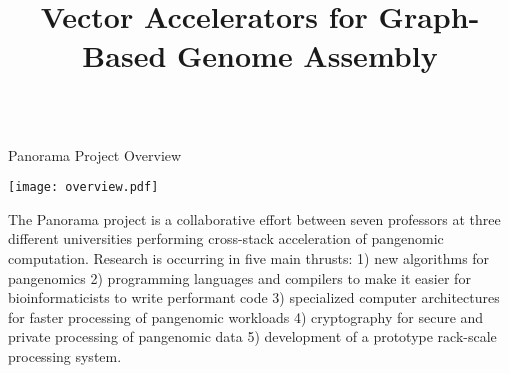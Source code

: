 \documentclass{cbxposter}
\title
{%
  Vector Accelerators for Graph-Based Genome Assembly
}
\renewcommand{\smallskip}{\vspace{0.16667in}}
\begin{document}
\begin{frame}[fragile,t]{}
\vspace{0.1in}
\begin{columns}[T]


\begin{column}{10.5in}
\vspace{0.4in}


\begin{block}{Panorama Project Overview}
  \begin{center}
    \texttt{[image: overview.pdf]}
  \end{center}

  \smallskip

  The Panorama project is a collaborative effort between seven professors
  at three different universities performing cross-stack acceleration of
  pangenomic computation. Research is occurring in five main thrusts: 1)
  new algorithms for pangenomics 2) programming languages and compilers to
  make it easier for bioinformaticists to write performant code 3)
  specialized computer architectures for faster processing of pangenomic
  workloads 4) cryptography for secure and private processing of pangenomic
  data 5) development of a prototype rack-scale processing system.


\end{block}
\end{column}
\end{columns}
\end{frame}
\end{document}
